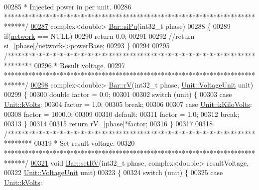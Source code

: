 \begin{DoxyCode}
00285 \textcolor{comment}{ * Injected power in per unit.}
00286 \textcolor{comment}{ ******************************************************************************/}
\hypertarget{bar_8cpp_source_l00287}{}\hyperlink{group___models_ga8ac94a6b5f69417da962a7d87361b416}{00287} complex<double> \hyperlink{group___models_ga8ac94a6b5f69417da962a7d87361b416}{Bar::siPu}(int32\_t phase)
00288 \{
00289   \textcolor{keywordflow}{if}(\hyperlink{class_bar_a80025f13884750add58cc61b318357ff}{network} == NULL)
00290     \textcolor{keywordflow}{return} 0.0;
00291 
00292   \textcolor{comment}{//return si\_[phase]/network->powerBase;}
00293 \}
00294 
00295 \textcolor{comment}{/*******************************************************************************}
00296 \textcolor{comment}{ * Result voltage.}
00297 \textcolor{comment}{ ******************************************************************************/}
\hypertarget{bar_8cpp_source_l00298}{}\hyperlink{group___models_ga2d1f6bfbd8abaf168bb75bd8e5cd9b5e}{00298} complex<double> \hyperlink{group___models_ga2d1f6bfbd8abaf168bb75bd8e5cd9b5e}{Bar::rV}(int32\_t phase, \hyperlink{class_unit_a55b07dfa9457e1eca2c7194fe0cfc3c1}{Unit::VoltageUnit} unit)
00299 \{
00300   \textcolor{keywordtype}{double} factor = 0.0;
00301 
00302   \textcolor{keywordflow}{switch} (unit) \{
00303   \textcolor{keywordflow}{case} \hyperlink{class_unit_a55b07dfa9457e1eca2c7194fe0cfc3c1aa54b2473993a702a3923525765bd6e4c}{Unit::kVolts}:
00304     factor = 1.0;
00305     \textcolor{keywordflow}{break};
00306 
00307   \textcolor{keywordflow}{case} \hyperlink{class_unit_a55b07dfa9457e1eca2c7194fe0cfc3c1a35a201a658c2cd89766787c657e9a54d}{Unit::kKiloVolts}:
00308     factor = 1000.0;
00309 
00310   \textcolor{keywordflow}{default}:
00311     factor = 1.0;
00312     \textcolor{keywordflow}{break};
00313   \}
00314 
00315   \textcolor{keywordflow}{return} rV\_[phase]*factor;
00316 \}
00317 
00318 \textcolor{comment}{/*******************************************************************************}
00319 \textcolor{comment}{ * Set result voltage.}
00320 \textcolor{comment}{ ******************************************************************************/}
\hypertarget{bar_8cpp_source_l00321}{}\hyperlink{group___models_ga2b2c5a373d87025e79d26aa9c4cea75a}{00321} \textcolor{keywordtype}{void} \hyperlink{group___models_ga2b2c5a373d87025e79d26aa9c4cea75a}{Bar::setRV}(int32\_t phase, complex<double> resultVoltage,
00322                 \hyperlink{class_unit_a55b07dfa9457e1eca2c7194fe0cfc3c1}{Unit::VoltageUnit} unit)
00323 \{
00324   \textcolor{keywordflow}{switch} (unit) \{
00325   \textcolor{keywordflow}{case} \hyperlink{class_unit_a55b07dfa9457e1eca2c7194fe0cfc3c1aa54b2473993a702a3923525765bd6e4c}{Unit::kVolts}:

\end{DoxyCode}
